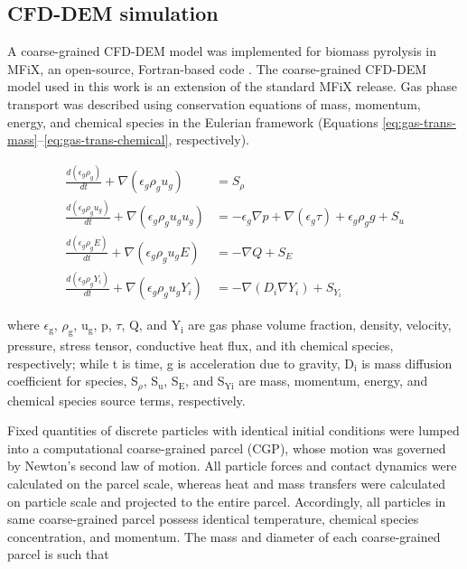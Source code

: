 
\subsection{CFD-DEM simulation}

A coarse-grained CFD-DEM model was implemented for biomass pyrolysis in MFiX, an open-source, Fortran-based code \cite{Syamlal-1993}. The coarse-grained CFD-DEM model used in this work is an extension of the standard MFiX release. Gas phase transport was described using conservation equations of mass, momentum, energy, and chemical species in the Eulerian framework (Equations \ref{eq:gas-trans-mass}--\ref{eq:gas-trans-chemical}, respectively).

\begin{align}
    \frac{d(\epsilon_g \rho_g)}{dt} + \nabla (\epsilon_g \rho_g u_g) &= S_\rho \label{eq:gas-trans-mass} \\
    \frac{d(\epsilon_g \rho_g u_g)}{dt} + \nabla (\epsilon_g \rho_g u_g u_g) &= -\epsilon_g \nabla p + \nabla (\epsilon_g \tau) + \epsilon_g \rho_g g + S_u \\
    \frac{d(\epsilon_g \rho_g E)}{dt} + \nabla (\epsilon_g \rho_g u_g E) &= -\nabla Q + S_E \\
    \frac{d(\epsilon_g \rho_g Y_i)}{dt} + \nabla (\epsilon_g \rho_g u_g Y_i) &= -\nabla (D_i \nabla Y_i) + S_{Y_i} \label{eq:gas-trans-chemical}
\end{align}

\noindent where $\epsilon_\text{g}$, $\rho_\text{g}$, u$_\text{g}$, p, $\tau$, Q, and Y$_\text{i}$ are gas phase volume fraction, density, velocity, pressure, stress tensor, conductive heat flux, and ith chemical species, respectively; while t is time, g is acceleration due to gravity, D$_\text{i}$ is mass diffusion coefficient for species, S$_\rho$, S$_\text{u}$, S$_\text{E}$, and S$_\text{Yi}$ are mass, momentum, energy, and chemical species source terms, respectively.

Fixed quantities of discrete particles with identical initial conditions were lumped into a computational coarse-grained parcel (CGP), whose motion was governed by Newton’s second law of motion. All particle forces and contact dynamics were calculated on the parcel scale, whereas heat and mass transfers were calculated on particle scale and projected to the entire parcel. Accordingly, all particles in same coarse-grained parcel possess identical temperature, chemical species concentration, and momentum. The mass and diameter of each coarse-grained parcel is such that

